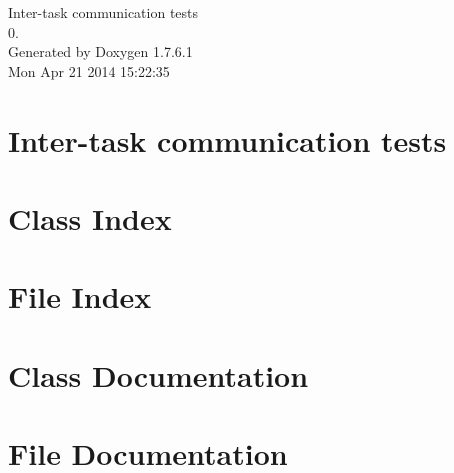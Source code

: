\documentclass[letterpaper]{book}
\begin{document}
\hypersetup{pageanchor=false,citecolor=blue}
\begin{titlepage}
\vspace*{7cm}
\begin{center}
{\Large \-Inter-\/task communication tests \\[1ex]\large 0. }\\
\vspace*{1cm}
{\large \-Generated by Doxygen 1.7.6.1}\\
\vspace*{0.5cm}
{\small Mon Apr 21 2014 15:22:35}\\
\end{center}
\end{titlepage}
\clearemptydoublepage
{}
\tableofcontents
\clearemptydoublepage
{}
\hypersetup{pageanchor=true,citecolor=blue}
\chapter{\-Inter-\/task communication tests}
\label{index}\hypertarget{index}{}
\chapter{\-Class \-Index}

\chapter{\-File \-Index}

\chapter{\-Class \-Documentation}







\chapter{\-File \-Documentation}














\printindex
\end{document}
